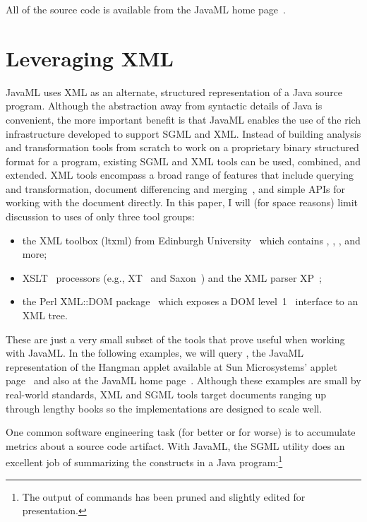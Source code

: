 \documentclass{article}
\begin{document}
\begin{multicols}{2}
All of the source code is available from the JavaML home
page~\cite{Badros-javaml}.

\section{Leveraging XML}
\label{sec-leveraging}

JavaML uses XML as an alternate, structured representation of a Java
source program.  Although the abstraction away from syntactic details of
Java is convenient, the more important benefit is that JavaML enables
the use of the rich infrastructure developed to support SGML and XML.
Instead of building analysis and transformation tools from scratch to
work on a proprietary binary structured format for a program, existing
SGML and XML tools can be used, combined, and extended.  XML tools
encompass a broad range of features that include querying and
transformation, document differencing and merging~\cite{XMLDiffMerge},
and simple APIs for working with the document directly.  In this paper,
I will (for space reasons) limit discussion to uses of only three tool
groups:

\begin{itemize}
\item the XML toolbox (ltxml) from Edinburgh University~\cite{ltxml}
which contains ,
, , and more;

\item XSLT~\cite{XSLT} processors (e.g., XT~\cite{Clark-XT} and Saxon~\cite{Saxon})
      and the XML parser XP~\cite{Clark-XP};

\item the Perl XML::DOM package~\cite{perlDOM} which exposes a
DOM level~1~\cite{DOM} interface to an XML tree.

\end{itemize}

These are just a very small subset of the tools that prove useful when
working with JavaML.  In the following examples, we will query
, the JavaML representation of the Hangman
applet available at Sun Microsystems' applet page~\cite{SunApplets} and
also at the JavaML home page~\cite{Badros-javaml}.  Although these examples
are small by real-world standards, XML and SGML tools target documents
ranging up through lengthy books so the implementations are designed to
scale well.

One common software engineering task (for better or for worse) is to
accumulate metrics about a source code artifact.  With JavaML, the SGML
utility  does an excellent job of summarizing the
constructs in a Java program:\footnote{The output of commands has been
  pruned and slightly edited for presentation.}



\end{multicols}
\end{document}
